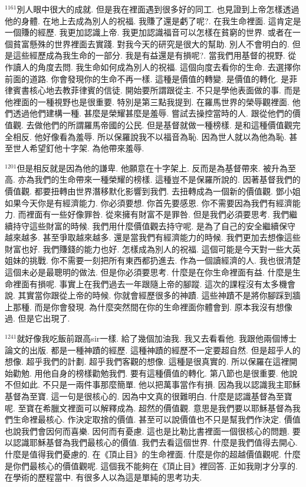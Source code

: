 \documentclass{book}
\begin{document}
$^{1161}$別人眼中很大的成就.
但是我在裡面遇到很多好的同工.
也見證到上帝怎樣透過他的身體.
在地上去成為別人的祝福.
我賺了還是虧了呢?.
在我生命裡面.
這肯定是一個賺的經歷.
我更加認識上帝.
我更加認識福音可以怎樣在貧窮的世界.
或者在一個貧富懸殊的世界裡面去實踐.
對我今天的研究是很大的幫助.
別人不會明白的.
但是這些經歷成為我生命的一部分.
我是有益還是有損呢?.
當我們用基督的視野.
從作讀人的角度去問.
我生命如何成為別人的祝福.
這個向度去看你的生命.
去選擇你前面的道路.
你會發現你的生命不再一樣.
這種是價值的轉變.
是價值的轉化.
是菲律賓書核心地去教菲律賓的信徒.
開始要所謂跟從主.
不只是學他表面做的事.
而是他裡面的一種視野也是很重要.
特別是第三點我提到.
在羅馬世界的榮辱觀裡面.
他們透過他們建構一種.
甚麼是榮耀甚麼是羞辱.
嘗試去操控當時的人.
跟從他們的價值觀.
去做他們的所謂羅馬帝國的公民.
但是基督就做一種榜樣.
是和這種價值觀完全相反.
他好像看為羞辱.
所以保羅說我不以福音為恥.
因為世人就以為他為恥.
甚至世人希望釘他十字架.
為他帶來羞辱.

$^{1201}$但是相反就是因為他的謙卑.
他願意在十字架上.
反而是為基督帶來.
被升為至高.
亦為我們的生命帶來一種榮耀的榜樣.
這種豈不是保羅所說的.
因著基督我們的價值觀.
都要扭轉由世界潛移默化影響到我們.
去扭轉成為一個新的價值觀.
鄧小姐如果今天你是有經濟能力.
你必須要想.
你首先要感恩.
你不需要因為我們有經濟能力.
而裡面有一些好像罪咎.
從來擁有財富不是罪咎.
但是我們必須要思考.
我們繼續持守這些財富的時候.
我們用什麼價值觀去持守呢.
是為了自己的安全繼續保守越來越多.
甚至爭取越來越多.
還是當我們有經濟能力的時候.
我們更加去想像這些財富也好.
我們賺錢的能力也好.
怎樣成為別人的祝福.
這個可能是今天對一些大英姐妹的挑戰.
你不需要一刻把所有東西都扔進去.
作為一個讀經濟的人.
我也很清楚這個未必是最聰明的做法.
但是你必須要思考.
什麼是在你生命裡面有益.
什麼是生命裡面有損呢.
事實上在我們過去一年跟隨上帝的腳蹤.
這次的課程沒有太多機會說.
其實當你跟從上帝的時候.
你就會經歷很多的神蹟.
這些神蹟不是將你腳踩到牆上那種.
而是你會發現.
為什麼突然間在你的生命裡面你體會到.
原本我沒有想像過.
但是它出現了.

$^{1241}$就好像我吃飯前跟高sir一樣.
給了幾個加油我.
我又去看看他.
我跟他兩個博士論文的出版.
都是一種神蹟的經歷.
這種神蹟的經歷不一定要超自然.
但是超乎人的想像.
超乎我們的計劃.
超乎我們客觀的想像.
這種是很真實的.
所以保羅在這裡開始勸勉.
用他自身的榜樣勸勉我們.
要有這種價值的轉化.
第八節也是很重要.
他說不但如此.
不只是一兩件事那麼簡單.
他以把萬事當作有損.
因為我以認識我主耶穌基督為至寶.
這一句是很核心的.
因為中文真的很難明白.
什麼是認識基督為至寶呢.
至寶在希臘文裡面可以解釋成為.
超然的價值觀.
意思是我們要以耶穌基督為我們生命裡最核心.
作決定取捨的價值.
甚至可以說價值也不只是幫我們作決定.
價值也說我們會因何而喜樂.
因何而有憂慮.
這也是比勒比書裡面一個很核心的問題.
要以認識耶穌基督為我們最核心的價值.
我們去看這個世界.
什麼是我們值得去開心.
什麼是值得我們憂慮的.
在《頂止目》的生命裡面.
什麼是你的超越價值觀呢.
什麼是你們最核心的價值觀呢.
這個我不能夠在《頂止目》裡回答.
正如我剛才分享的.
在學術的歷程當中.
有很多人以為這是單純的思考功夫.
\end{document}
